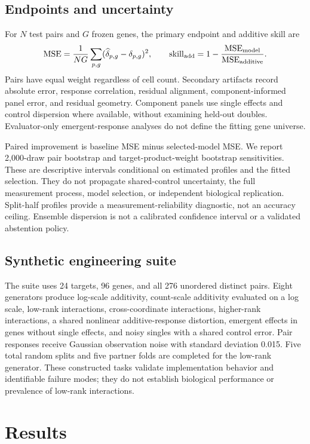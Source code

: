 \documentclass{article}
\begin{document}
\subsection{Endpoints and uncertainty}
For $N$ test pairs and $G$ frozen genes, the primary endpoint and additive skill are
\begin{equation}\operatorname{MSE}=\frac{1}{NG}\sum_{p,g}(\widehat\delta_{p,g}-\delta_{p,g})^2,\qquad \operatorname{skill}_{\rm add}=1-\frac{\operatorname{MSE}_{\rm model}}{\operatorname{MSE}_{\rm additive}}.\end{equation}
Pairs have equal weight regardless of cell count. Secondary artifacts record absolute error, response correlation, residual alignment, component-informed panel error, and residual geometry. Component panels use single effects and control dispersion where available, without examining held-out doubles. Evaluator-only emergent-response analyses do not define the fitting gene universe.

Paired improvement is baseline MSE minus selected-model MSE. We report 2,000-draw pair bootstrap and target-product-weight bootstrap sensitivities. These are descriptive intervals conditional on estimated profiles and the fitted selection. They do not propagate shared-control uncertainty, the full measurement process, model selection, or independent biological replication. Split-half profiles provide a measurement-reliability diagnostic, not an accuracy ceiling. Ensemble dispersion is not a calibrated confidence interval or a validated abstention policy.

\subsection{Synthetic engineering suite}
The suite uses 24 targets, 96 genes, and all 276 unordered distinct pairs. Eight generators produce log-scale additivity, count-scale additivity evaluated on a log scale, low-rank interactions, cross-coordinate interactions, higher-rank interactions, a shared nonlinear additive-response distortion, emergent effects in genes without single effects, and noisy singles with a shared control error. Pair responses receive Gaussian observation noise with standard deviation 0.015. Five total random splits and five partner folds are completed for the low-rank generator. These constructed tasks validate implementation behavior and identifiable failure modes; they do not establish biological performance or prevalence of low-rank interactions.

\section{Results}
\end{document}

